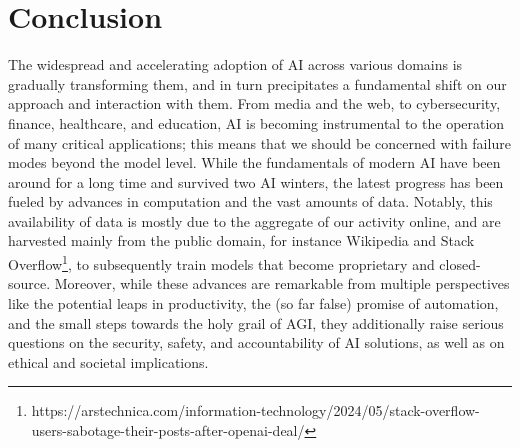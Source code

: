 \chapter{Conclusion}\label{ch:conclusion}

The widespread and accelerating adoption of \gls{AI} across various domains is gradually transforming them, and in turn precipitates a fundamental shift on our approach and interaction with them. 
From media and the web, to cybersecurity, finance, healthcare, and education, AI is becoming instrumental to the operation of many critical applications; this means that we should be concerned with failure modes beyond the model level.
While the fundamentals of modern AI have been around for a long time and survived two \gls{AI} winters, the latest progress has been fueled by advances in computation and the vast amounts of data.
Notably, this availability of data is mostly due to the aggregate of our activity online, and are harvested mainly from the public domain, for instance Wikipedia and Stack Overflow\footnote{https://arstechnica.com/information-technology/2024/05/stack-overflow-users-sabotage-their-posts-after-openai-deal/}, to subsequently train models that become proprietary and closed-source.
Moreover, while these advances are remarkable from multiple perspectives like the potential leaps in productivity, the (so far false) promise of automation, and the small steps towards the holy grail of \gls{AGI}, they additionally raise serious questions on the security, safety, and accountability of \gls{AI} solutions, as well as on ethical and societal implications.

